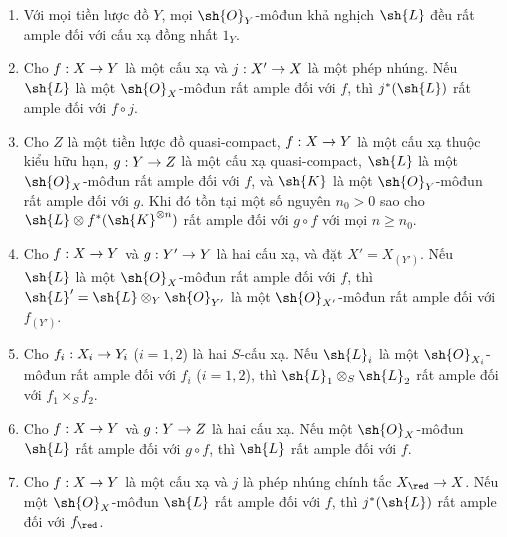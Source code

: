 \documentclass[oneside,10pt]{amsart}
\makeatletter
\renewcommand{\geq}{\geqslant}
\newcommand{\ega@arrow}[2]{\mathchoice{#1}{#2}{#2}{#2}}
\renewcommand{\to}{\ega@arrow{\longrightarrow}{\rightarrow}}
\let\EGAOriginalLabel\label
\renewcommand{\label}[1]{\phantomsection\EGAOriginalLabel{#1}}
\makeatother
\begin{document}
\begin{proposition}[4.4.10]
\label{II.4.4.10}
\medskip\noindent
\begin{enumerate}
  \item[\rm{(i)}] Với mọi tiền lược đồ $Y$, mọi $\sh{O}_Y$-môđun khả nghịch $\sh{L}$ đều rất ample đối với cấu xạ đồng nhất $1_Y$.
  \item[\rm{(i \emph{bis})}] Cho $f:X\to Y$ là một cấu xạ và $j:X'\to X$ là một phép nhúng.
  Nếu $\sh{L}$ là một $\sh{O}_X$-môđun rất ample đối với $f$, thì $j^*(\sh{L})$ rất ample đối với $f\circ j$.
  \item[\rm{(ii)}] Cho $Z$ là một tiền lược đồ quasi-compact, $f:X\to Y$ là một cấu xạ thuộc kiểu hữu hạn, $g:Y\to Z$ là một cấu xạ quasi-compact, $\sh{L}$ là một $\sh{O}_X$-môđun rất ample đối với $f$, và $\sh{K}$ là một $\sh{O}_Y$-môđun rất ample đối với $g$.
  Khi đó tồn tại một số nguyên $n_0>0$ sao cho $\sh{L}\otimes f^*(\sh{K}^{\otimes n})$ rất ample đối với $g\circ f$ với mọi $n\geq n_0$.
  \item[\rm{(iii)}] Cho $f:X\to Y$ và $g:Y'\to Y$ là hai cấu xạ, và đặt $X'=X_{(Y')}$.
  Nếu $\sh{L}$ là một $\sh{O}_X$-môđun rất ample đối với $f$, thì $\sh{L}'=\sh{L}\otimes_Y\sh{O}_{Y'}$ là một $\sh{O}_{X'}$-môđun rất ample đối với $f_{(Y')}$.
  \item[\rm{(iv)}] Cho $f_i:X_i\to Y_i$ ($i=1,2$) là hai $S$-cấu xạ.
  Nếu $\sh{L}_i$ là một $\sh{O}_{X_i}$-môđun rất ample đối với $f_i$ ($i=1,2$), thì $\sh{L}_1\otimes_S\sh{L}_2$ rất ample đối với $f_1\times_S f_2$.
  \item[\rm{(v)}] Cho $f:X\to Y$ và $g:Y\to Z$ là hai cấu xạ.
  Nếu một $\sh{O}_X$-môđun $\sh{L}$ rất ample đối với $g\circ f$, thì $\sh{L}$ rất ample đối với $f$.
  \item[\rm{(vi)}] Cho $f:X\to Y$ là một cấu xạ và $j$ là phép nhúng chính tắc $X_\red\to X$.
  Nếu một $\sh{O}_X$-môđun $\sh{L}$ rất ample đối với $f$, thì $j^*(\sh{L})$ rất ample đối với $f_\red$.
\end{enumerate}
\end{proposition}
\end{document}
